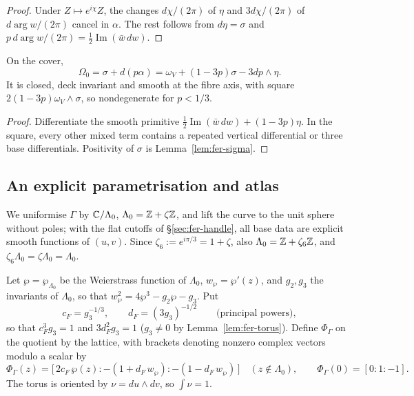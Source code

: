\begin{proof}
Under $Z\mapsto e^{i\chi}Z$, the changes $d\chi/(2\pi)$ of $\eta$ and $3d\chi/(2\pi)$ of $d\arg w/(2\pi)$ cancel in $\alpha$. The rest follows from $d\eta=\sigma$ and $p\,d\arg w/(2\pi)=\frac12\operatorname{Im}(\bar w\,dw)$.
\end{proof}

\begin{lemma}\label{lem:fer-Omega0}
On the cover,
\begin{equation}\label{eq:fer-Omega0-local}
 \Omega_0=\sigma+d(p\alpha)
 =\omega_V+(1-3p)\sigma-3dp\wedge\eta.
\end{equation}
It is closed, deck invariant and smooth at the fibre axis, with square
$2(1-3p)\omega_V\wedge\sigma$, so nondegenerate for $p<1/3$.
\end{lemma}

\begin{proof}
Differentiate the smooth primitive $\frac12\operatorname{Im}(\bar w\,dw)+(1-3p)\eta$. In the square, every other mixed term contains a repeated vertical differential or three base differentials. Positivity of $\sigma$ is Lemma~\ref{lem:fer-sigma}.
\end{proof}

\subsection{An explicit parametrisation and atlas}\label{sec:fer-torus}

We uniformise $\Gamma$ by $\mathbb{C}/\Lambda_0$, $\Lambda_0=\mathbb{Z}+\zeta\mathbb{Z}$, and lift the curve to the unit sphere without poles; with the flat cutoffs of \S\ref{sec:fer-handle}, all base data are explicit smooth functions of $(u,v)$. Since $\zeta_6:=e^{i\pi/3}=1+\zeta$, also $\Lambda_0=\mathbb{Z}+\zeta_6\mathbb{Z}$, and $\zeta_6\Lambda_0=\zeta\Lambda_0=\Lambda_0$.

\begin{definition}\label{def:fer-torus}
Let $\wp=\wp_{\Lambda_0}$ be the Weierstrass function of $\Lambda_0$, $w_\wp=\wp'(z)$, and $g_2,g_3$ the invariants of
$\Lambda_0$, so that $w_\wp^2=4\wp^3-g_2\wp-g_3$. Put
\[
 c_F=g_3^{-1/3},\qquad d_F=(3g_3)^{-1/2}\qquad\text{(principal powers)},
\]
so that $c_F^3g_3=1$ and $3d_F^2g_3=1$ ($g_3\ne0$ by Lemma~\ref{lem:fer-torus}). Define $\Phi_\Gamma$ on the quotient by the lattice, with brackets denoting nonzero complex vectors modulo a scalar by
\[
 \Phi_\Gamma(z)=\big[\,2c_F\,\wp(z):-(1+d_F\,w_\wp):-(1-d_F\,w_\wp)\,\big]\quad(z\notin\Lambda_0),\qquad
 \Phi_\Gamma(0)=[0:1:-1].
\]
The torus is oriented by $\nu=du\wedge dv$, so $\int\nu=1$.
\end{definition}

